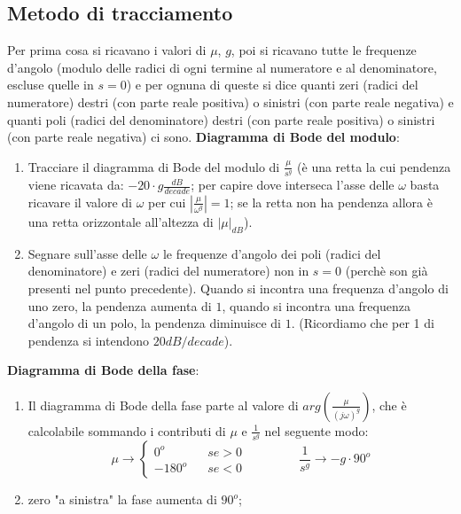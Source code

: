 \begin{landscape}
\begin{multicols*}{3}
    \subsection{Metodo di tracciamento}
    Per prima cosa si ricavano i valori di $\mu$, $g$, poi si ricavano tutte le frequenze d'angolo (modulo delle radici di ogni termine al numeratore e al denominatore, escluse quelle in $s=0$) e per ognuna di queste si dice quanti zeri (radici del numeratore) destri (con parte reale positiva) o sinistri (con parte reale negativa) e quanti poli (radici del denominatore) destri (con parte reale positiva) o sinistri (con parte reale negativa) ci sono.\newline
    \newline
    \textbf{Diagramma di Bode del modulo}: 
    \begin{enumerate}
        \item Tracciare il diagramma di Bode del modulo di $\frac{\mu}{s^g}$ (è una retta la cui pendenza viene ricavata da: $-20 \cdot g \frac{dB}{decade}$; per capire dove interseca l'asse delle $\omega$ basta ricavare il valore di $\omega$ per cui $\left| \frac{\mu}{\omega^g} \right| = 1$; se la retta non ha pendenza allora è una retta orizzontale all'altezza di $|\mu|_{dB}$).
        \item Segnare sull'asse delle $\omega$ le frequenze d'angolo dei poli (radici del denominatore) e zeri (radici del numeratore) non in $s=0$ (perchè son già presenti nel punto precedente).\newline
        Quando si incontra una frequenza d'angolo di uno zero, la pendenza aumenta di $1$, quando si incontra una frequenza d'angolo di un polo, la pendenza diminuisce di $1$. (Ricordiamo che per 1 di pendenza si intendono $20 dB/decade$).
    \end{enumerate}
    \textbf{Diagramma di Bode della fase}:
    \begin{enumerate}
        \item Il diagramma di Bode della fase parte al valore di $arg(\frac{\mu}{(j \omega)^g})$, che è calcolabile sommando i contributi di $\mu$ e $\frac{1}{s^g}$ nel seguente modo:
        \[
            \mu \rightarrow \begin{cases}
                0^o \;\;\;& se > 0\\
                -180^o \;\;\; & se <0
            \end{cases} \;\;\;\;\;\;\;\;\;\;\;\;\;\;\; \frac{1}{s^g}\rightarrow -g \cdot 90^o
        \]
        \item zero "a sinistra" la fase aumenta di $90^o$;\newline

\end{enumerate}
\end{multicols*}
\end{landscape}
